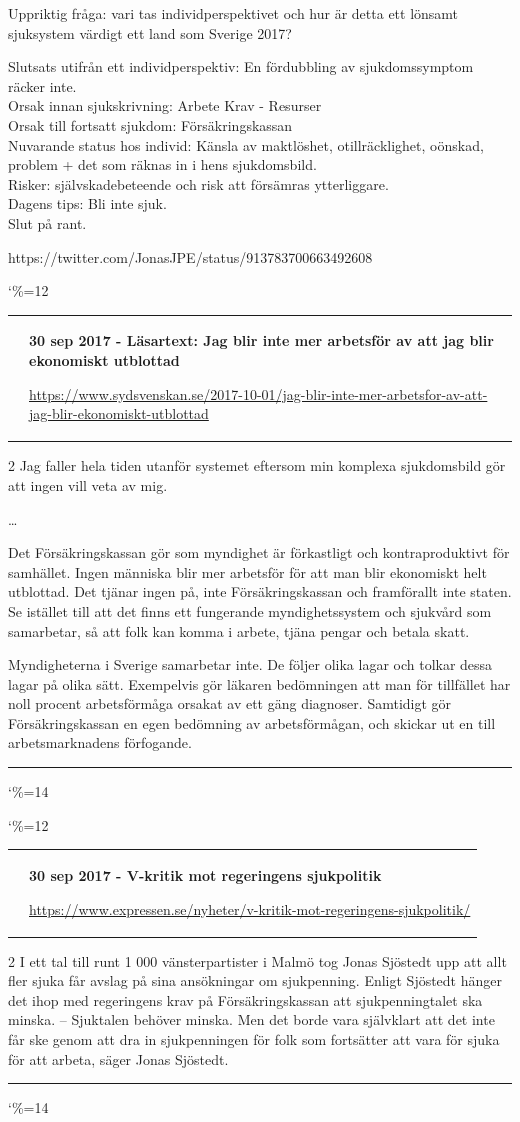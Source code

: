 \documentclass[a4paper]{article}
\makeatletter
\newcommand{\entry}{
\catcode`\%=12
\@entry}
\newcommand{\@entry}[4][]{
\bigskip
\begin{tabular*}{\textwidth}{l m{\textwidth-4cm}}
\qrcode{#4} & \textbf{#2}

\medskip

\url{#4}

\end{tabular*}

\medskip


\begin{multicols}{2}
#3
\end{multicols}

#1

\medskip
\hrule

\catcode`\%=14
}
\makeatother
\begin{document}
{{{Uppriktig fråga: vari tas individperspektivet och hur är detta ett lönsamt sjuksystem värdigt ett land som Sverige 2017?

Slutsats utifrån ett individperspektiv: En fördubbling av sjukdomssymptom räcker inte.\\
Orsak innan sjukskrivning: Arbete Krav - Resurser\\
Orsak till fortsatt sjukdom: Försäkringskassan\\
Nuvarande status hos individ: Känsla av maktlöshet, otillräcklighet, oönskad, problem + det som räknas in i hens sjukdomsbild.\\
Risker: självskadebeteende och risk att försämras ytterliggare.\\
Dagens tips: Bli inte sjuk.\\
Slut på rant.
}{https://twitter.com/JonasJPE/status/913783700663492608}

\entry{30 sep 2017 - Läsartext: Jag blir inte mer arbetsför av att jag blir ekonomiskt utblottad}{Jag faller hela tiden utanför systemet eftersom min komplexa sjukdomsbild gör att ingen vill veta av mig.

\ldots

Det Försäkringskassan gör som myndighet är förkastligt och kontraproduktivt för samhället. Ingen människa blir mer arbetsför för att man blir ekonomiskt helt utblottad. Det tjänar ingen på, inte Försäkringskassan och framförallt inte staten. Se istället till att det finns ett fungerande myndighetssystem och sjukvård som samarbetar, så att folk kan komma i arbete, tjäna pengar och betala skatt.

Myndigheterna i Sverige samarbetar inte. De följer olika lagar och tolkar dessa lagar på olika sätt. Exempelvis gör läkaren bedömningen att man för tillfället har noll procent arbetsförmåga orsakat av ett gäng diagnoser. Samtidigt gör Försäkringskassan en egen bedömning av arbetsförmågan, och skickar ut en till arbetsmarknadens förfogande.
}{https://www.sydsvenskan.se/2017-10-01/jag-blir-inte-mer-arbetsfor-av-att-jag-blir-ekonomiskt-utblottad}

\entry{30 sep 2017 - V-kritik mot regeringens sjukpolitik}{I ett tal till runt 1 000 vänsterpartister i Malmö tog Jonas Sjöstedt upp att allt fler sjuka får avslag på sina ansökningar om sjukpenning. Enligt Sjöstedt hänger det ihop med regeringens krav på Försäkringskassan att sjukpenningtalet ska minska.
– Sjuktalen behöver minska. Men det borde vara självklart att det inte får ske genom att dra in sjukpenningen för folk som fortsätter att vara för sjuka för att arbeta, säger Jonas Sjöstedt.}{https://www.expressen.se/nyheter/v-kritik-mot-regeringens-sjukpolitik/}


}}
\end{document}
